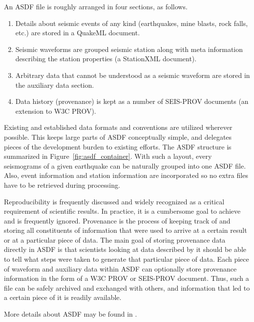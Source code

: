 An ASDF file is roughly arranged in four sections, as follows.
\begin{enumerate}
    \item Details about seismic events of any kind (earthquakes, mine blasts,
        rock falls, etc.) are stored in a QuakeML document.
    \item Seismic waveforms are grouped seismic station
        along with meta information describing the station properties
        (a StationXML document).
    \item Arbitrary data that cannot be understood as a seismic waveform are
        stored in the auxiliary data section.
    \item Data history (provenance) is kept as a number of SEIS-PROV
     documents (an extension to W3C PROV).
\end{enumerate}

Existing and established data formats and conventions are utilized wherever
possible. This keeps large parts of ASDF conceptually simple, and delegates
pieces of the development burden to existing efforts. The ASDF structure is
summarized in Figure~\ref{fig:asdf_container}. With such a layout, every
seismograms of a given earthquake can be naturally grouped into one ASDF file.
Also, event information and station information are incorporated so no extra
files have to be retrieved during processing.

Reproducibility is frequently discussed and widely recognized as a critical
requirement of scientific results. In practice, it is a cumbersome goal to
achieve and is frequently ignored. Provenance is the process of keeping track of
and storing all constituents of information that were used to arrive at a
certain result or at a particular piece of data. The main goal of storing
provenance data directly in ASDF is that scientists looking at data described by it should be able to tell what
steps were taken to generate that particular piece of data. Each piece of
waveform and auxiliary data within ASDF can optionally store provenance
information in the form of a W3C PROV or SEIS-PROV document. Thus, such a file
can be safely archived and exchanged with others, and information that led to a
certain piece of it is readily available.

More details about ASDF may be found in \cite{krischer2016adaptable}.

